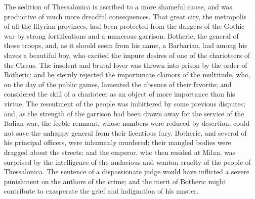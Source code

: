 


The sedition of Thessalonica is ascribed to a more shameful
cause, and was productive of much more dreadful consequences.
That great city, the metropolis of all the Illyrian provinces,
had been protected from the dangers of the Gothic war by strong
fortifications and a numerous garrison. Botheric, the general of
those troops, and, as it should seem from his name, a Barbarian,
had among his slaves a beautiful boy, who excited the impure
desires of one of the charioteers of the Circus. The insolent and
brutal lover was thrown into prison by the order of Botheric; and
he sternly rejected the importunate clamors of the multitude,
who, on the day of the public games, lamented the absence of
their favorite; and considered the skill of a charioteer as an
object of more importance than his virtue. The resentment of the
people was imbittered by some previous disputes; and, as the
strength of the garrison had been drawn away for the service of
the Italian war, the feeble remnant, whose numbers were reduced
by desertion, could not save the unhappy general from their
licentious fury. Botheric, and several of his principal officers,
were inhumanly murdered; their mangled bodies were dragged about
the streets; and the emperor, who then resided at Milan, was
surprised by the intelligence of the audacious and wanton cruelty
of the people of Thessalonica. The sentence of a dispassionate
judge would have inflicted a severe punishment on the authors of
the crime; and the merit of Botheric might contribute to
exasperate the grief and indignation of his master.

